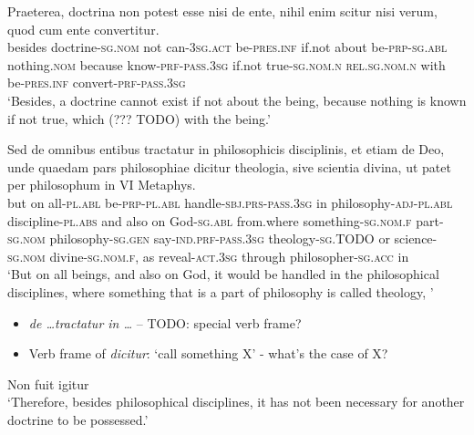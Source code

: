 \documentclass[a4paper, 12pt]{article}
\newcommand{\form}[1]{\emph{#1}}
\newcommand*{\category}[1]{\textsc{#1}}
\newcommand{\translate}[1]{`#1'}
\begin{document}
\begin{exe}
    \ex \gll Praeterea, doctrina non potest esse nisi de ente, 
    nihil enim scitur nisi verum, 
    quod cum ente convertitur. \\
    besides doctrine-\category{sg.nom} not can-\category{3sg.act} be-\category{pres.inf}
    if.not about be-\category{prp}-\category{sg.abl}
    nothing.\category{nom} because know-\category{prf}-\category{pass.3sg}
    if.not true-\category{sg.nom.n} 
    \category{rel}.\category{sg.nom.n} with be-\category{pres.inf} convert-\category{prf}-\category{pass.3sg} \\
    \translate{Besides, a doctrine cannot exist if not about the being, 
    because nothing is known if not true, 
    which (??? TODO) with the being.}
    
    \ex \gll Sed de omnibus entibus 
    tractatur in philosophicis disciplinis, 
    et etiam de Deo, 
    unde quaedam pars philosophiae dicitur theologia, 
    sive scientia divina, 
    ut patet per philosophum in VI Metaphys. \\
    but on all-\category{pl.abl} be-\category{prp}-\category{pl.abl}  
    handle-\category{sbj.prs}-\category{pass.3sg} in philosophy-\category{adj}-\category{pl.abl} discipline-\category{pl.abs} 
    and also on God-\category{sg.abl}
    from.where something-\category{sg.nom.f} part-\category{sg.nom} philosophy-\category{sg.gen} say-\category{ind.prf}-\category{pass.3sg} theology-\category{sg.TODO} 
    or science-\category{sg.nom} divine-\category{sg.nom.f},
    as reveal-\category{act.3sg} through philosopher-\category{sg.acc} in  \\
    \glt \translate{But on all beings, and also on God, 
    it would be handled in the philosophical disciplines, 
    where something that is a part of philosophy is called theology,
    }
\end{exe}

\begin{itemize}
    \item \form{de \dots tractatur in \dots} -- TODO: special verb frame?
    \item Verb frame of \form{dicitur}: \translate{call something X} - what's the case of X?
\end{itemize}

\begin{exe}
    \ex Non fuit igitur \\
    \translate{Therefore, besides philosophical disciplines, 
    it has not been necessary for another doctrine to be possessed.}
\end{exe}
\end{document}
